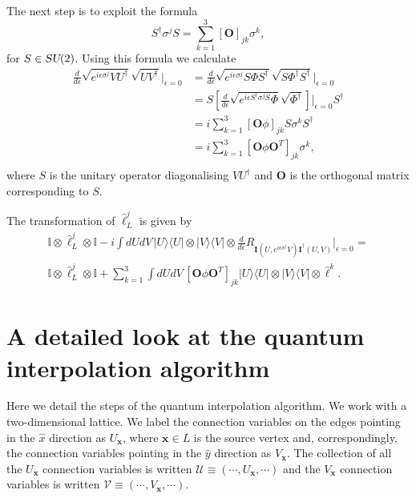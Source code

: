 \documentclass[12pt]{amsart}
\def\su2{\textsl{SU}(2)}
\theoremstyle{definition}
\theoremstyle{remark}
\numberwithin{equation}{section}
\begin{document}
The next step is to exploit the formula
\begin{equation}
	S^\dag \sigma^{j} S = \sum_{k = 1}^3 [\mathbf{O}]_{jk} \sigma^k,
\end{equation}
for $S \in \su2$. Using this formula we calculate
\begin{equation}\label{eq:derivatesu2product}
	\begin{split}
	\frac{d}{d\epsilon}\sqrt{e^{i\epsilon \sigma^j} VU^\dag}\sqrt{U V^\dag}\bigg|_{\epsilon =0} &= \frac{d}{d\epsilon}\sqrt{e^{i\epsilon \sigma^j} S \Phi S^\dag}\sqrt{S \Phi^\dag S^\dag}\bigg|_{\epsilon =0} \\
	&= S\left[\frac{d}{d\epsilon}\sqrt{e^{i\epsilon S^\dag \sigma^j S}  \Phi }\sqrt{ \Phi^\dag }\right]\bigg|_{\epsilon =0} S^\dag \\
	&= i \sum_{k=1}^3 [\mathbf{O} \phi ]_{jk}  S\sigma^k S^\dag \\
	&= i \sum_{k=1}^3 [\mathbf{O} \phi \mathbf{O}^T]_{jk}  \sigma^k, \\
	\end{split}
\end{equation}
where $S$ is the unitary operator diagonalising $VU^\dag$ and $\mathbf{O}$ is the orthogonal matrix corresponding to $S$.

The transformation of $\widehat{\ell}^j_L$ is given by
\begin{multline}
	\mathbb{I}\otimes \widehat{\ell}_L^{j}\otimes \mathbb{I}  -i\int dUdV \, |U\rangle\langle U| \otimes  |V\rangle\langle V| \otimes \frac{d}{d\epsilon} R_{\mathbf{I}(U,e^{i\epsilon \sigma^j}V) \mathbf{I}^\dag(U,V)}\bigg|_{\epsilon = 0} = \\
	\mathbb{I}\otimes \widehat{\ell}_L^{j}\otimes \mathbb{I} + \sum_{k=1}^3 \int dUdV \, [\mathbf{O} \phi \mathbf{O}^T]_{jk} |U\rangle\langle U| \otimes  |V\rangle\langle V| \otimes  \widehat{\ell}^k.
\end{multline}

\section{A detailed look at the quantum interpolation algorithm}
Here we detail the steps of the quantum interpolation algorithm. We work with a two-dimensional lattice. We label the connection variables on the edges pointing in the $\widehat{x}$ direction as $U_\mathbf{x}$, where $\mathbf{x}\in L$ is the source vertex and, correspondingly, the connection variables pointing in the $\widehat{y}$ direction as $V_\mathbf{x}$. The collection of all the $U_\mathbf{x}$ connection variables is written $\mathcal{U} \equiv (\cdots, U_\mathbf{x}, \cdots)$ and the $V_\mathbf{x}$ connection variables is written $\mathcal{V} \equiv (\cdots, V_\mathbf{x}, \cdots)$.
\end{document}

